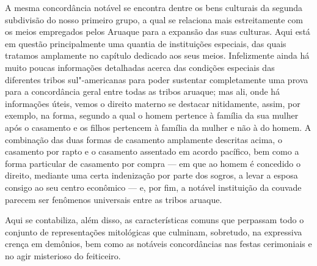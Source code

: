 A mesma concordância notável se encontra dentre os bens culturais da
segunda subdivisão do nosso primeiro grupo, a qual se relaciona mais
estreitamente com os meios empregados pelos Aruaque para a expansão das
suas culturas. Aqui está em questão principalmente uma quantia de
instituições especiais, das quais tratamos amplamente no capítulo
dedicado aos seus meios. Infelizmente ainda há muito poucas informações
detalhadas acerca das condições especiais das diferentes tribos
sul"-americanas para poder sustentar completamente uma prova para a
concordância geral entre todas as tribos aruaque; mas ali, onde há
informações úteis, vemos o direito materno se destacar nitidamente,
assim, por exemplo, na forma, segundo a qual o homem pertence à família
da sua mulher após o casamento e os filhos pertencem à família da
mulher e não à do homem. A combinação das duas formas de casamento
amplamente descritas acima, o casamento por rapto e o casamento
assentado em acordo pacífico, bem como a forma particular de casamento
por compra --- em que ao homem é concedido o direito, mediante uma certa
indenização por parte dos sogros, a levar a esposa consigo ao seu centro
econômico --- e, por fim, a notável instituição da couvade parecem ser
fenômenos universais entre as tribos aruaque.

Aqui se contabiliza, além disso, as características comuns que perpassam
todo o conjunto de representações mitológicas que culminam, sobretudo,
na expressiva crença em demônios, bem como as notáveis concordâncias nas
festas cerimoniais e no agir misterioso do feiticeiro.

